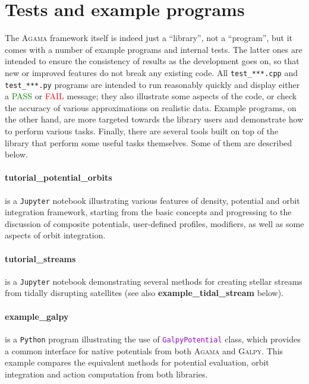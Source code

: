 \documentclass[12pt]{article}
\newcommand{\Agama}{\textsc{Agama}\xspace}
\newcommand{\Galpy}{\textsc{Galpy}\xspace}
\newcommand{\Python}{\texttt{Python}\xspace}
\newcommand{\ttt}[1]{\textcolor{darkviolet}{\texttt{#1}}}
\let\oldparagraph\paragraph
\renewcommand{\paragraph}[1]{\vspace{-2mm}\oldparagraph{#1}}
\begin{document}
\section{Tests and example programs}  \label{sec:ExamplesTests}

The \Agama framework itself is indeed just a ``library'', not a ``program'', but it comes with a number of example programs and internal tests. The latter ones are intended to ensure the consistency of results as the development goes on, so that new or improved features do not break any existing code. All \texttt{test_***.cpp} and \texttt{test_***.py} programs are intended to run reasonably quickly and display either a \textcolor{Green}{PASS} or \textcolor{Red}{FAIL} message; they also illustrate some aspects of the code, or check the accuracy of various approximations on realistic data. Example programs, on the other hand, are more targeted towards the library users and demonstrate how to perform various tasks. Finally, there are several tools built on top of the library that perform some useful tasks themselves. Some of them are described below.

\paragraph{tutorial_potential_orbits} is a \texttt{Jupyter} notebook illustrating various features of density, potential and orbit integration framework, starting from the basic concepts and progressing to the discussion of composite potentials, user-defined profiles, modifiers, as well as some aspects of orbit integration.


\paragraph{tutorial_streams} is a \texttt{Jupyter} notebook demonstrating several methods for creating stellar streams from tidally disrupting satellites (see also \textbf{example_tidal_stream} below).

\paragraph{example_galpy} is a \Python program illustrating the use of \ttt{GalpyPotential} class, which provides a common interface for native potentials from both \Agama and \Galpy. This example compares the equivalent methods for potential evaluation, orbit integration and action computation from both libraries.
\end{document}
